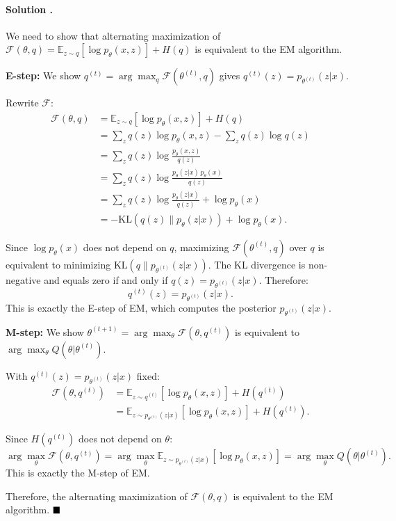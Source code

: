 \documentclass{article}
\newcounter{solutionCount}
\newcommand{\solution}[1]{
    \stepcounter{solutionCount}
    \paragraph{Solution \thesolutionCount.}
    {
        #1
    }
}
\begin{document}
\solution{
    We need to show that alternating maximization of $\mathcal{F}(\theta, q) = \mathbb{E}_{z \sim q}[\log p_\theta(x,z)] + H(q)$ is equivalent to the EM algorithm.

    \textbf{E-step:} We show $q^{(t)} = \arg\max_q \mathcal{F}(\theta^{(t)}, q)$ gives $q^{(t)}(z) = p_{\theta^{(t)}}(z|x)$.

    Rewrite $\mathcal{F}$:
    \begin{align}
    \mathcal{F}(\theta, q)
    &= \mathbb{E}_{z \sim q}[\log p_\theta(x,z)] + H(q) \nonumber \\
    &= \sum_z q(z) \log p_\theta(x,z) - \sum_z q(z) \log q(z) \nonumber \\
    &= \sum_z q(z) \log \frac{p_\theta(x,z)}{q(z)} \nonumber \\
    &= \sum_z q(z) \log \frac{p_\theta(z|x) \, p_\theta(x)}{q(z)} \nonumber \\
    &= \sum_z q(z) \log \frac{p_\theta(z|x)}{q(z)} + \log p_\theta(x) \nonumber \\
    &= -\mathrm{KL}(q(z) \| p_\theta(z|x)) + \log p_\theta(x). \label{eq:F-rewrite}
    \end{align}

    Since $\log p_\theta(x)$ does not depend on $q$, maximizing $\mathcal{F}(\theta^{(t)}, q)$ over $q$ is equivalent to minimizing $\mathrm{KL}(q \| p_{\theta^{(t)}}(z|x))$. The KL divergence is non-negative and equals zero if and only if $q(z) = p_{\theta^{(t)}}(z|x)$. Therefore:
    \[
      q^{(t)}(z) = p_{\theta^{(t)}}(z|x).
    \]
    This is exactly the E-step of EM, which computes the posterior $p_{\theta^{(t)}}(z|x)$.

    \bigskip
    \textbf{M-step:} We show $\theta^{(t+1)} = \arg\max_\theta \mathcal{F}(\theta, q^{(t)})$ is equivalent to $\arg\max_\theta Q(\theta|\theta^{(t)})$.

    With $q^{(t)}(z) = p_{\theta^{(t)}}(z|x)$ fixed:
    \begin{align}
    \mathcal{F}(\theta, q^{(t)})
    &= \mathbb{E}_{z \sim q^{(t)}}[\log p_\theta(x,z)] + H(q^{(t)}) \nonumber \\
    &= \mathbb{E}_{z \sim p_{\theta^{(t)}}(z|x)}[\log p_\theta(x,z)] + H(q^{(t)}). \nonumber
    \end{align}

    Since $H(q^{(t)})$ does not depend on $\theta$:
    \[
      \arg\max_\theta \mathcal{F}(\theta, q^{(t)}) = \arg\max_\theta \mathbb{E}_{z \sim p_{\theta^{(t)}}(z|x)}[\log p_\theta(x,z)] = \arg\max_\theta Q(\theta|\theta^{(t)}).
    \]
    This is exactly the M-step of EM.

    Therefore, the alternating maximization of $\mathcal{F}(\theta, q)$ is equivalent to the EM algorithm. $\hfill\blacksquare$
}
\end{document}

